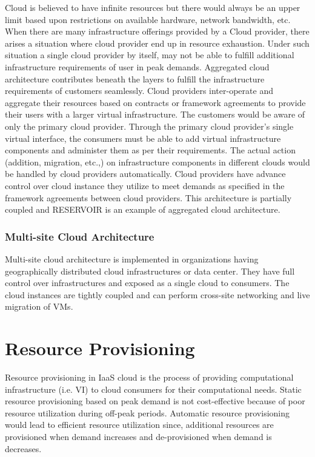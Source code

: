 \documentclass[conference]{IEEEtran}
\begin{document}
Cloud is believed to have infinite resources but there would always be an upper limit based upon restrictions on available hardware, network bandwidth, etc. When there are many infrastructure offerings provided by a Cloud provider, there arises a situation where cloud provider end up in resource exhaustion. Under such situation a single cloud provider by itself, may not be able to fulfill additional infrastructure requirements of user in peak demands. Aggregated cloud architecture contributes beneath the layers to fulfill the infrastructure requirements of customers seamlessly. Cloud providers inter-operate and aggregate their resources based on contracts or framework agreements to provide their users with a larger virtual infrastructure. The customers would be aware of only the primary cloud provider. Through the primary cloud provider's single virtual interface, the consumers must be able to add virtual infrastructure components and administer them as per their requirements. The actual action (addition, migration, etc.,) on infrastructure components in different clouds would be handled by cloud providers automatically. Cloud providers have advance control over cloud instance they utilize to meet demands as specified in the framework agreements between cloud providers\cite {6165242,infosys}. This architecture is partially coupled and RESERVOIR\cite{rochwerger2009reservoir} is an example of aggregated cloud architecture. 
\subsubsection{Multi-site Cloud Architecture}
Multi-site cloud architecture is implemented in organizations having geographically distributed cloud infrastructures or data center. They have full control over infrastructures and exposed as a single cloud to consumers. The cloud instances are tightly coupled and can perform cross-site networking and live migration of VMs.
\section{Resource Provisioning}

Resource provisioning in IaaS cloud is the process of providing computational infrastructure (i.e. VI) to cloud consumers for their computational needs. Static resource provisioning based on peak demand is not cost-effective because of poor resource utilization during off-peak periods\cite{hu2009resource}. Automatic resource provisioning would lead to efficient resource utilization since, additional resources are provisioned when demand increases and de-provisioned when demand is decreases. 
\end{document}
